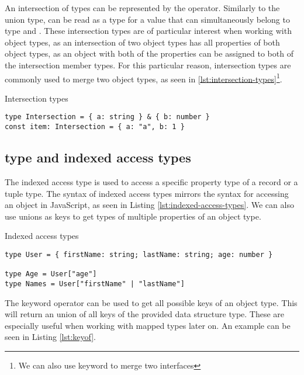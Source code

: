 An intersection of types can be represented by the \code{\&} operator. Similarly to the union type,  can be read as a type for a value that can simultaneously belong to type  and . These intersection types are of particular interest when working with object types, as an intersection of two object types has all properties of both object types, as an object with both of the properties can be assigned to both of the intersection member types. For this particular reason, intersection types are commonly used to merge two object types, as seen in \ref{lst:intersection-types}\footnote{We can also use  keyword to merge two interfaces}.

\begin{listing}[ht]
  \caption{Intersection types}\label{lst:intersection-types}
  \begin{verbatim}
type Intersection = { a: string } & { b: number }
const item: Intersection = { a: "a", b: 1 }
  \end{verbatim}
\end{listing}

\subsection{ type and indexed access types}

The indexed access type is used to access a specific property type of a record or a tuple type. The syntax of indexed access types mirrors the syntax for accessing an object in JavaScript, as seen in Listing \ref{lst:indexed-access-types}. We can also use unions as keys to get types of multiple properties of an object type.

\begin{listing}[ht]
  \caption{Indexed access types}\label{lst:indexed-access-types}
  \begin{verbatim}
type User = { firstName: string; lastName: string; age: number }

type Age = User["age"] 
type Names = User["firstName" | "lastName"]
\end{verbatim}
\end{listing}

The  keyword operator can be used to get all possible keys of an object type. This will return an union of all keys of the provided data structure type. These are especially useful when working with mapped types later on. An example can be seen in Listing \ref{lst:keyof}.

